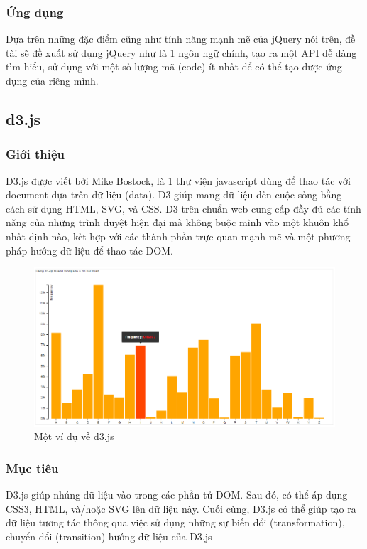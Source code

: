 \documentclass[12pt,a4paper,oneside]{article}
\begin{document}
\subsubsection{Ứng dụng}
Dựa trên những đặc điểm cũng như tính năng mạnh mẽ của jQuery nói trên, đề tài sẽ đề xuất sử dụng jQuery như là 1 ngôn ngữ chính, tạo ra một API dễ dàng tìm hiểu, sử dụng với một số lượng mã (code) ít nhất để có thể tạo được ứng dụng của riêng mình.

\subsection{d3.js}
\subsubsection{Giới thiệu}
D3.js được viết bởi Mike Bostock, là 1 thư viện javascript dùng để thao tác với document dựa trên dữ liệu (data). D3 giúp mang dữ liệu đến cuộc sống bằng cách sử dụng HTML, SVG, và CSS. D3 trên chuẩn web cung cấp đầy đủ các tính năng của những trình duyệt hiện đại mà không buộc mình vào một khuôn khổ nhất định nào, kết hợp với các thành phần trực quan mạnh mẽ và một phương pháp hướng dữ liệu để thao tác DOM.

\begin{center}
    \begin{figure}[htp]
    \begin{center}
     \includegraphics[scale=.6]{image/d3}
    \end{center}
    \caption{Một ví dụ về d3.js}
    \label{refhinh14}
    \end{figure}
\end{center}

\subsubsection{Mục tiêu}
D3.js giúp nhúng dữ liệu vào trong các phần tử DOM. Sau đó, có thể áp dụng CSS3, HTML, và/hoặc SVG lên dữ liệu này. Cuối cùng, D3.js có thể giúp tạo ra dữ liệu tương tác thông qua việc sử dụng những sự biến đổi (transformation), chuyển đổi (transition) hướng dữ liệu của D3.js
\end{document}

